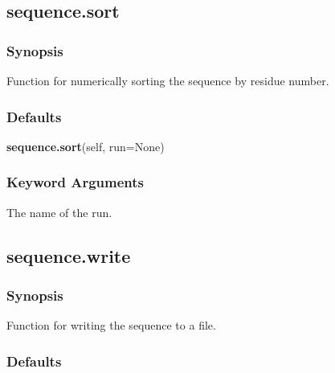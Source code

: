 

  

 \newpage 

 \subsection{sequence.sort} 

  
 \subsubsection{Synopsis} 

 Function for numerically sorting the sequence by residue number. 
  

  
 \subsubsection{Defaults} 

 \textsf{\textbf{sequence.sort}(self, run=None)} 

  
 \subsubsection{Keyword Arguments} 

   The name of the run.  

  

  

 \newpage 

 \subsection{sequence.write} 

  
 \subsubsection{Synopsis} 

 Function for writing the sequence to a file. 
  

  
 \subsubsection{Defaults} 

